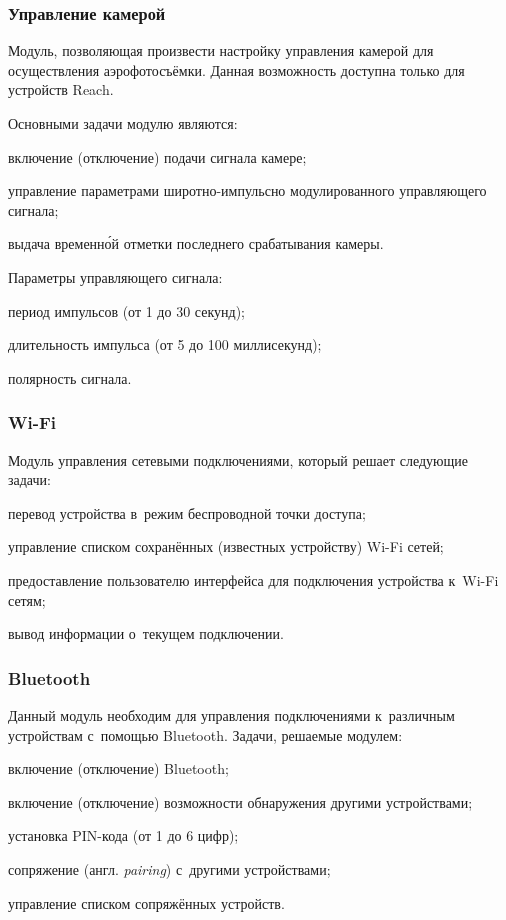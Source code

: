 \subsubsection{Управление камерой}

Модуль, позволяющая произвести настройку управления камерой для осуществления аэрофотосъёмки. Данная возможность доступна только для устройств Reach.

Основными задачи модулю являются:
\begin{dashitemize}
  \item включение (отключение) подачи сигнала камере;
  \item управление параметрами широтно-импульсно модулированного управляющего сигнала;
  \item выдача временн\'ой отметки последнего срабатывания камеры.
\end{dashitemize}

Параметры управляющего сигнала:
\begin{dashitemize}
  \item период импульсов (от 1 до 30 секунд);
  \item длительность импульса (от 5 до 100 миллисекунд);
  \item полярность сигнала.
\end{dashitemize}


\subsubsection{Wi-Fi}

Модуль управления сетевыми подключениями, который решает следующие задачи:
\begin{dashitemize}
  \item перевод устройства в~режим беспроводной точки доступа;
  \item управление списком сохранённых (известных устройству) Wi-Fi сетей;
  \item предоставление пользователю интерфейса для подключения устройства к~Wi-Fi сетям;
  \item вывод информации о~текущем подключении.
\end{dashitemize}


\subsubsection{Bluetooth}

Данный модуль необходим для управления подключениями к~различным устройствам с~помощью Bluetooth. Задачи, решаемые модулем:
\begin{dashitemize}
  \item включение (отключение) Bluetooth;
  \item включение (отключение) возможности обнаружения другими устройствами;
  \item установка PIN-кода (от 1 до 6 цифр);
  \item сопряжение (англ. \emph{pairing}) с~другими устройствами;
  \item управление списком сопряжённых устройств.
\end{dashitemize}


